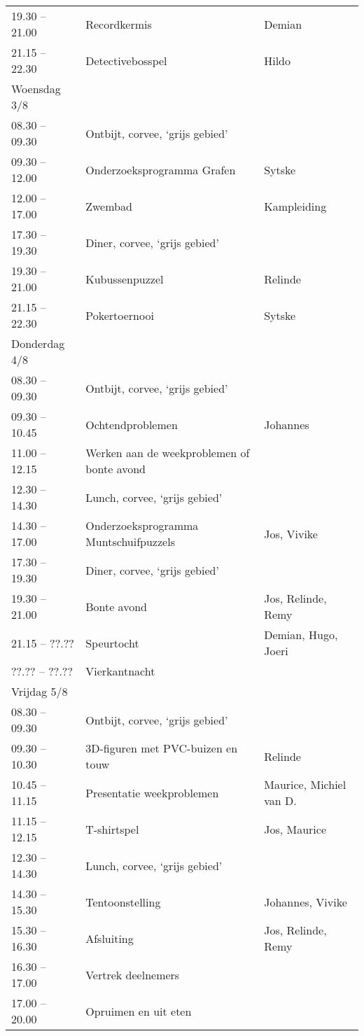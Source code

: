 \begin{center}
\begin{small}
\begin{tabular}{|l|l|l|}
19.30 -- 21.00 & Recordkermis & Demian\\
21.15 -- 22.30 & Detectivebosspel & Hildo\\
\hline
Woensdag 3/8 & & \\
\hline
08.30 -- 09.30 & Ontbijt, corvee, `grijs gebied' & \\
09.30 -- 12.00 & Onderzoeksprogramma Grafen & Sytske\\
12.00 -- 17.00 & Zwembad & Kampleiding \\
17.30 -- 19.30 & Diner, corvee, `grijs gebied' & \\
19.30 -- 21.00 & Kubussenpuzzel & Relinde\\
21.15 -- 22.30 & Pokertoernooi & Sytske\\
\hline
Donderdag 4/8 & & \\
\hline
08.30 -- 09.30 & Ontbijt, corvee, `grijs gebied' & \\
09.30 -- 10.45 & Ochtendproblemen & Johannes\\
11.00 -- 12.15 & Werken aan de weekproblemen of bonte avond & \\
12.30 -- 14.30 & Lunch, corvee, `grijs gebied' & \\
14.30 -- 17.00 & Onderzoeksprogramma Muntschuifpuzzels & Jos, Vivike\\
17.30 -- 19.30 & Diner, corvee, `grijs gebied' & \\
19.30 -- 21.00 & Bonte avond & Jos, Relinde, Remy\\
21.15 -- ??.?? & Speurtocht & Demian, Hugo, Joeri\\
??.?? -- ??.?? & Vierkantnacht & \\
\hline
Vrijdag 5/8 & & \\
\hline
08.30 -- 09.30 & Ontbijt, corvee, `grijs gebied' & \\
09.30 -- 10.30 & 3D-figuren met PVC-buizen en touw & Relinde\\
10.45 -- 11.15 & Presentatie weekproblemen & Maurice, Michiel van D.\\
11.15 -- 12.15 & T-shirtspel & Jos, Maurice\\
12.30 -- 14.30 & Lunch, corvee, `grijs gebied' & \\
14.30 -- 15.30 & Tentoonstelling & Johannes, Vivike\\
15.30 -- 16.30 & Afsluiting & Jos, Relinde, Remy\\
16.30 -- 17.00 & Vertrek deelnemers & \\
17.00 -- 20.00 & Opruimen en uit eten & \\
\hline
\end{tabular}
\end{small}
\end{center}


